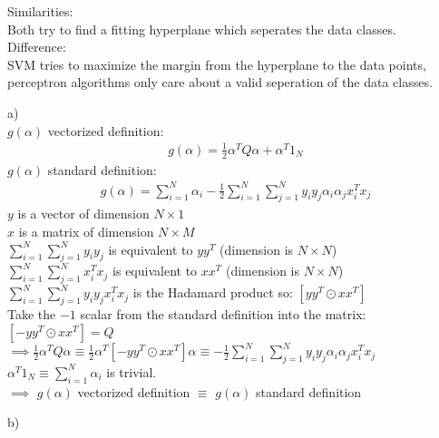 %
%
%
\begin{flushleft}
Similarities: \\
Both try to find a fitting hyperplane which seperates the data classes.\\
Difference: \\
SVM tries to maximize the margin from the hyperplane to the data points, perceptron algorithms only care about a valid seperation of the data classes.
\end{flushleft}
%
%
%
\begin{flushleft}
a)\\
$g(\alpha)$ vectorized definition:
\begin{align*}
g(\alpha) = \frac{1}{2}\alpha^{T}Q\alpha + \alpha^{T}1_{N}
\end{align*}
$g(\alpha)$ standard definition:
\begin{align*}
g(\alpha) = \sum_{i=1}^{N}\alpha_{i}-\frac{1}{2}\sum_{i=1}^{N}\sum_{j=1}^{N}
y_{i}y_{j}\alpha_{i}\alpha_{j}x^{T}_{i}x_{j}
\end{align*}
$y$ is a vector of dimension $N\times 1$\\
$x$ is a matrix of dimension $N\times M$\\
$\sum_{i=1}^{N}\sum_{j=1}^{N}y_{i}y_{j}$ is equivalent to $yy^{T}$ 
(dimension is $N\times N$)\\
$\sum_{i=1}^{N}\sum_{j=1}^{N}x^{T}_{i}x_{j}$ is equivalent to $xx^{T}$ 
(dimension is $N\times N$)\\
$\sum_{i=1}^{N}\sum_{j=1}^{N}y_{i}y_{j}x^{T}_{i}x_{j}$ is the Hadamard product so:
$[yy^{T} \odot xx^{T}]$\\
Take the $-1$ scalar from the standard definition into the matrix: 
$[-yy^{T} \odot xx^{T}] = Q$\\
$\implies \frac{1}{2}\alpha^{T}Q\alpha \equiv \frac{1}{2}\alpha^{T}[-yy^{T} 
\odot xx^{T}]\alpha \equiv -\frac{1}{2}\sum_{i=1}^{N}\sum_{j=1}^{N}y_{i}y_{j}\alpha_{i}
\alpha_{j}x^{T}_{i}x_{j}$\\
$\alpha^{T}1_{N} \equiv \sum_{i=1}^{N}\alpha_{i}$ is trivial.\\
$\implies$ $g(\alpha)$ vectorized definition $\equiv$ $g(\alpha)$ standard definition
\end{flushleft}
\begin{flushleft}
b)\\

\end{flushleft}
%
%
%
%
%
%
%
%
%
%
%
%
%
%



